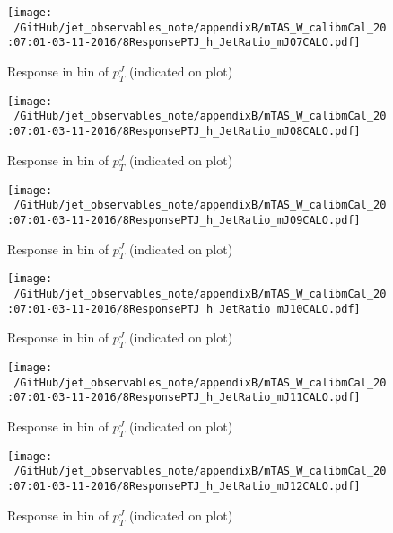 \begin{figure}

\texttt{[image: ~/GitHub/jet\_observables\_note/appendixB/mTAS\_W\_calibmCal\_20:07:01-03-11-2016/8ResponsePTJ\_h\_JetRatio\_mJ07CALO.pdf]}
\caption{Response in bin of  $p_{T}^{J}$ (indicated on plot)} 

\end{figure}

\clearpage

\begin{figure}

\texttt{[image: ~/GitHub/jet\_observables\_note/appendixB/mTAS\_W\_calibmCal\_20:07:01-03-11-2016/8ResponsePTJ\_h\_JetRatio\_mJ08CALO.pdf]}
\caption{Response in bin of  $p_{T}^{J}$ (indicated on plot)} 

\end{figure}

\begin{figure}

\texttt{[image: ~/GitHub/jet\_observables\_note/appendixB/mTAS\_W\_calibmCal\_20:07:01-03-11-2016/8ResponsePTJ\_h\_JetRatio\_mJ09CALO.pdf]}
\caption{Response in bin of  $p_{T}^{J}$ (indicated on plot)} 

\end{figure}

\begin{figure}

\texttt{[image: ~/GitHub/jet\_observables\_note/appendixB/mTAS\_W\_calibmCal\_20:07:01-03-11-2016/8ResponsePTJ\_h\_JetRatio\_mJ10CALO.pdf]}
\caption{Response in bin of  $p_{T}^{J}$ (indicated on plot)} 

\end{figure}

\begin{figure}

\texttt{[image: ~/GitHub/jet\_observables\_note/appendixB/mTAS\_W\_calibmCal\_20:07:01-03-11-2016/8ResponsePTJ\_h\_JetRatio\_mJ11CALO.pdf]}
\caption{Response in bin of  $p_{T}^{J}$ (indicated on plot)} 

\end{figure}

\begin{figure}

\texttt{[image: ~/GitHub/jet\_observables\_note/appendixB/mTAS\_W\_calibmCal\_20:07:01-03-11-2016/8ResponsePTJ\_h\_JetRatio\_mJ12CALO.pdf]}
\caption{Response in bin of  $p_{T}^{J}$ (indicated on plot)} 

\end{figure}
